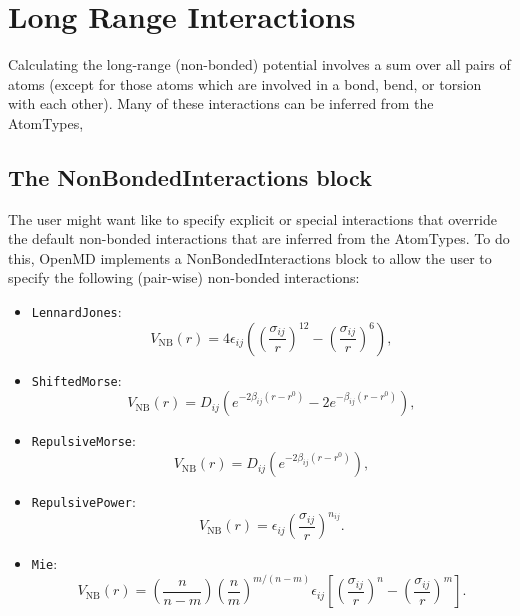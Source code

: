 \documentclass[]{book}
\begin{document}
\section{\label{section::ffLongRange}Long Range Interactions}

Calculating the long-range (non-bonded) potential involves a sum over
all pairs of atoms (except for those atoms which are involved in a
bond, bend, or torsion with each other).  Many of these interactions
can be inferred from the AtomTypes,

\subsection{\label{section:ffNBinteraction}The NonBondedInteractions
  block}

The user might want like to specify explicit or special interactions
that override the default non-bonded interactions that are inferred
from the AtomTypes.  To do this, OpenMD implements a
NonBondedInteractions block to allow the user to specify the following
(pair-wise) non-bonded interactions:

\begin{itemize}
\item {\tt LennardJones}:
\begin{equation*}
V_{\text{NB}}(r) = 4 \epsilon_{ij} \left(
  \left(\frac{\sigma_{ij}}{r} \right)^{12} -
  \left(\frac{\sigma_{ij}}{r} \right)^{6} \right),
\end{equation*}
\item {\tt ShiftedMorse}:
\begin{equation*}
 V_{\text{NB}}(r) = D_{ij} \left( e^{-2 \beta_{ij} (r -
     r^0)} - 2 e^{- \beta_{ij} (r -
     r^0)} \right),
\end{equation*}
\item {\tt RepulsiveMorse}:
\begin{equation*}
 V_{\text{NB}}(r) = D_{ij} \left( e^{-2 \beta_{ij} (r -
     r^0)} \right),
\end{equation*}
\item {\tt RepulsivePower}:
\begin{equation*}
  V_{\text{NB}}(r) = \epsilon_{ij}
  \left(\frac{\sigma_{ij}}{r} \right)^{n_{ij}}.
\end{equation*}
\item {\tt Mie}:
\begin{equation*}
  V_{\text{NB}}(r) =  \left(\frac{n}{n-m}\right)
  \left(\frac{n}{m}\right)^{m/(n-m)} \epsilon_{ij} \left[
  \left(\frac{\sigma_{ij}}{r} \right)^{n} -
  \left(\frac{\sigma_{ij}}{r} \right)^{m} \right].
\end{equation*}
\end{itemize}
\end{document}
